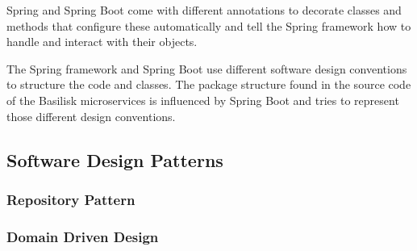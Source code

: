 Spring and Spring Boot come with different annotations to decorate classes and methods that configure these automatically and tell the Spring framework how to handle and interact with their objects.

The Spring framework and Spring Boot use different software design conventions to structure the code and classes.
The package structure found in the source code of the Basilisk microservices is influenced by Spring Boot and tries to represent those different design conventions.


\subsection{Software Design Patterns}
\label{sec:software_design_patterns}


\subsubsection{Repository Pattern}

\subsubsection{Domain Driven Design}
